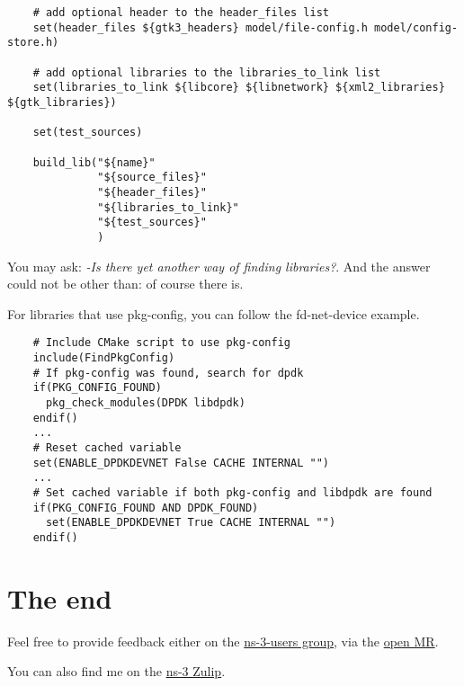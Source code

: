 \documentclass{article}
\begin{document}
\begin{verbatim}
    # add optional header to the header_files list
    set(header_files ${gtk3_headers} model/file-config.h model/config-store.h)

    # add optional libraries to the libraries_to_link list
    set(libraries_to_link ${libcore} ${libnetwork} ${xml2_libraries} ${gtk_libraries})

    set(test_sources)

    build_lib("${name}"
              "${source_files}"
              "${header_files}"
              "${libraries_to_link}"
              "${test_sources}"
              )

    \end{verbatim}

    You may ask: \textit{-Is there yet another way of finding libraries?}.
    And the answer could not be other than: of course there is.

    For libraries that use pkg-config, you can follow the fd-net-device example.
    \begin{verbatim}
    # Include CMake script to use pkg-config
    include(FindPkgConfig)
    # If pkg-config was found, search for dpdk
    if(PKG_CONFIG_FOUND)
      pkg_check_modules(DPDK libdpdk)
    endif()
    ...
    # Reset cached variable
    set(ENABLE_DPDKDEVNET False CACHE INTERNAL "")
    ...
    # Set cached variable if both pkg-config and libdpdk are found
    if(PKG_CONFIG_FOUND AND DPDK_FOUND)
      set(ENABLE_DPDKDEVNET True CACHE INTERNAL "")
    endif()
    \end{verbatim}


\section*{The end}
    Feel free to provide feedback either on the \href{https://groups.google.com/g/ns-3-users}{ns-3-users group},
    via the \href{https://gitlab.com/nsnam/ns-3-dev/-/merge_requests/460}{open MR}.

    You can also find me on the \href{https://ns-3.zulipchat.com/}{ns-3 Zulip}.
\end{document}
